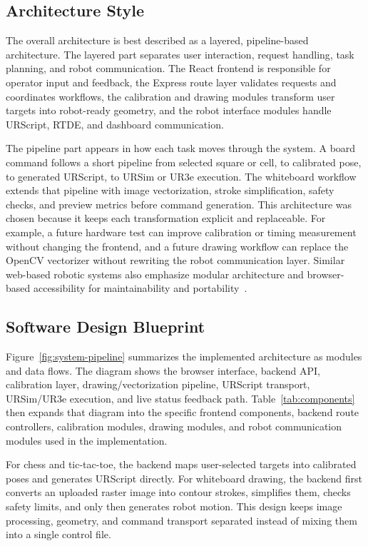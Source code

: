 \documentclass[12pt]{article}
\begin{document}
\subsection{Architecture Style}
The overall architecture is best described as a layered, pipeline-based architecture. The layered part separates user interaction, request handling, task planning, and robot communication. The React frontend is responsible for operator input and feedback, the Express route layer validates requests and coordinates workflows, the calibration and drawing modules transform user targets into robot-ready geometry, and the robot interface modules handle URScript, RTDE, and dashboard communication.

The pipeline part appears in how each task moves through the system. A board command follows a short pipeline from selected square or cell, to calibrated pose, to generated URScript, to URSim or UR3e execution. The whiteboard workflow extends that pipeline with image vectorization, stroke simplification, safety checks, and preview metrics before command generation. This architecture was chosen because it keeps each transformation explicit and replaceable. For example, a future hardware test can improve calibration or timing measurement without changing the frontend, and a future drawing workflow can replace the OpenCV vectorizer without rewriting the robot communication layer. Similar web-based robotic systems also emphasize modular architecture and browser-based accessibility for maintainability and portability~\cite{web-telepresence}.

\subsection{Software Design Blueprint}
Figure~\ref{fig:system-pipeline} summarizes the implemented architecture as modules and data flows. The diagram shows the browser interface, backend API, calibration layer, drawing/vectorization pipeline, URScript transport, URSim/UR3e execution, and live status feedback path. Table~\ref{tab:components} then expands that diagram into the specific frontend components, backend route controllers, calibration modules, drawing modules, and robot communication modules used in the implementation.

For chess and tic-tac-toe, the backend maps user-selected targets into calibrated poses and generates URScript directly. For whiteboard drawing, the backend first converts an uploaded raster image into contour strokes, simplifies them, checks safety limits, and only then generates robot motion. This design keeps image processing, geometry, and command transport separated instead of mixing them into a single control file.
\end{document}
